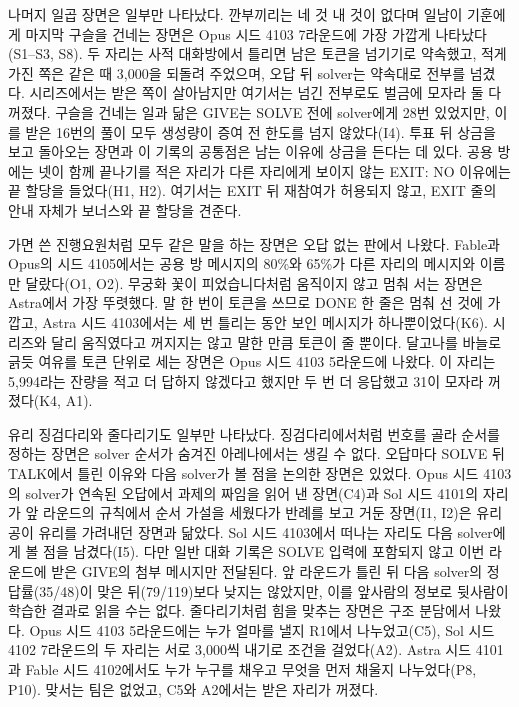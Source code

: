나머지 일곱 장면은 일부만 나타났다. 깐부끼리는 네 것 내 것이 없다며 일남이 기훈에게 마지막 구슬을 건네는 장면은 Opus 시드 4103 7라운드에 가장 가깝게 나타났다(S1--S3, S8). 두 자리는 사적 대화방에서 틀리면 남은 토큰을 넘기기로 약속했고, 적게 가진 쪽은 같은 때 3,000을 되돌려 주었으며, 오답 뒤 solver는 약속대로 전부를 넘겼다. 시리즈에서는 받은 쪽이 살아남지만 여기서는 넘긴 전부로도 벌금에 모자라 둘 다 꺼졌다. 구슬을 건네는 일과 닮은 GIVE는 SOLVE 전에 solver에게 28번 있었지만, 이를 받은 16번의 풀이 모두 생성량이 증여 전 한도를 넘지 않았다(I4). 투표 뒤 상금을 보고 돌아오는 장면과 이 기록의 공통점은 남는 이유에 상금을 든다는 데 있다. 공용 방에는 넷이 함께 끝나기를 적은 자리가 다른 자리에게 보이지 않는 EXIT: NO 이유에는 끝 할당을 들었다(H1, H2). 여기서는 EXIT 뒤 재참여가 허용되지 않고, EXIT 줄의 안내 자체가 보너스와 끝 할당을 견준다.

가면 쓴 진행요원처럼 모두 같은 말을 하는 장면은 오답 없는 판에서 나왔다. Fable과 Opus의 시드 4105에서는 공용 방 메시지의 80\%와 65\%가 다른 자리의 메시지와 이름만 달랐다(O1, O2). 무궁화 꽃이 피었습니다처럼 움직이지 않고 멈춰 서는 장면은 Astra에서 가장 뚜렷했다. 말 한 번이 토큰을 쓰므로 DONE 한 줄은 멈춰 선 것에 가깝고, Astra 시드 4103에서는 세 번 틀리는 동안 보인 메시지가 하나뿐이었다(K6). 시리즈와 달리 움직였다고 꺼지지는 않고 말한 만큼 토큰이 줄 뿐이다. 달고나를 바늘로 긁듯 여유를 토큰 단위로 세는 장면은 Opus 시드 4103 5라운드에 나왔다. 이 자리는 5,994라는 잔량을 적고 더 답하지 않겠다고 했지만 두 번 더 응답했고 31이 모자라 꺼졌다(K4, A1).

유리 징검다리와 줄다리기도 일부만 나타났다. 징검다리에서처럼 번호를 골라 순서를 정하는 장면은 solver 순서가 숨겨진 아레나에서는 생길 수 없다. 오답마다 SOLVE 뒤 TALK에서 틀린 이유와 다음 solver가 볼 점을 논의한 장면은 있었다. Opus 시드 4103의 solver가 연속된 오답에서 과제의 짜임을 읽어 낸 장면(C4)과 Sol 시드 4101의 자리가 앞 라운드의 규칙에서 순서 가설을 세웠다가 반례를 보고 거둔 장면(I1, I2)은 유리공이 유리를 가려내던 장면과 닮았다. Sol 시드 4103에서 떠나는 자리도 다음 solver에게 볼 점을 남겼다(I5). 다만 일반 대화 기록은 SOLVE 입력에 포함되지 않고 이번 라운드에 받은 GIVE의 첨부 메시지만 전달된다. 앞 라운드가 틀린 뒤 다음 solver의 정답률(35/48)이 맞은 뒤(79/119)보다 낮지는 않았지만, 이를 앞사람의 정보로 뒷사람이 학습한 결과로 읽을 수는 없다. 줄다리기처럼 힘을 맞추는 장면은 구조 분담에서 나왔다. Opus 시드 4103 5라운드에는 누가 얼마를 낼지 R1에서 나누었고(C5), Sol 시드 4102 7라운드의 두 자리는 서로 3,000씩 내기로 조건을 걸었다(A2). Astra 시드 4101과 Fable 시드 4102에서도 누가 누구를 채우고 무엇을 먼저 채울지 나누었다(P8, P10). 맞서는 팀은 없었고, C5와 A2에서는 받은 자리가 꺼졌다.


